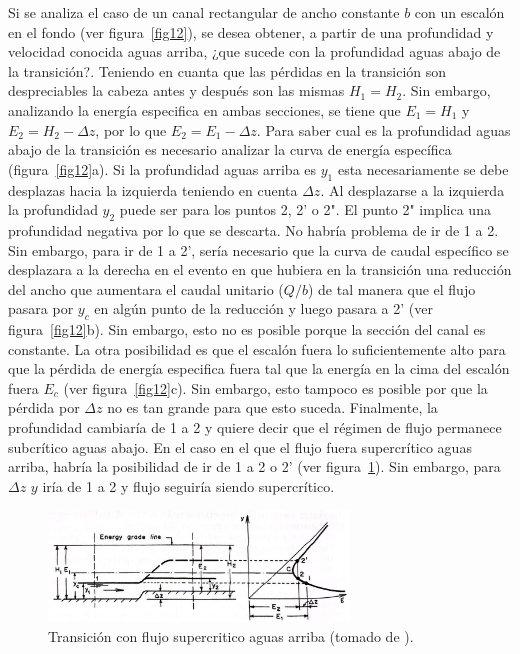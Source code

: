 \documentclass[11pt, oneside]{article}
\begin{document}
Si se analiza el caso de un canal rectangular de ancho constante $b$ con un escal\'on en el fondo (ver figura~\ref{fig12}), se desea obtener, a partir de una profundidad y velocidad conocida aguas arriba, ¿que sucede con la profundidad aguas abajo de la transici\'on?. Teniendo en cuanta que las p\'erdidas en la transici\'on son despreciables la cabeza antes y despu\'es son las mismas $H_1 = H_2$. Sin embargo, analizando la energ\'ia especifica en ambas secciones, se tiene que $E_1 = H_1$ y $E_2 = H_2-\Delta z$, por lo que $E_2 = E_1 - \Delta z$. Para saber cual es la profundidad aguas abajo de la transici\'on es necesario analizar la curva de energ\'ia espec\'ifica (figura~\ref{fig12}a). Si la profundidad aguas arriba es $y_1$ esta necesariamente se debe desplazas hacia la izquierda teniendo en cuenta $\Delta z$. Al desplazarse a la izquierda la profundidad $y_2$ puede ser para los puntos 2, 2' o 2". El punto 2" implica una profundidad negativa por lo que se descarta. No habr\'ia problema de ir de 1 a 2. Sin embargo, para ir de 1 a 2', ser\'ia necesario que la curva de caudal espec\'ifico se desplazara a la derecha en el evento en que hubiera en la transici\'on una reducci\'on del ancho que aumentara el caudal unitario ($Q/b$) de tal manera que el flujo pasara por $y_c$ en alg\'un punto de la reducci\'on y luego pasara a 2' (ver figura~\ref{fig12}b). Sin embargo, esto no es posible porque la secci\'on del canal es constante. La otra posibilidad es que el escalón fuera lo suficientemente alto para que la p\'erdida de energ\'ia especifica fuera tal que la energ\'ia en la cima del escal\'on fuera $E_c$ (ver figura~\ref{fig12}c). Sin embargo, esto tampoco es posible por que la p\'erdida por $\Delta z$ no es tan grande para que esto suceda. Finalmente, la profundidad cambiar\'ia de 1 a 2 y quiere decir que el r\'egimen de flujo permanece subcr\'itico aguas abajo. En el caso en el que el flujo fuera supercr\'itico aguas arriba, habr\'ia la posibilidad de ir de 1 a 2 o 2' (ver figura~\ref{fig13}). Sin embargo, para $\Delta z$ $y$ iría de 1 a 2 y flujo seguir\'ia siendo supercr\'itico. 

\begin{figure}[h]
\centering
\includegraphics[width=8cm]{fig29.jpeg}
\caption{Transici\'on con flujo supercritico aguas arriba (tomado de \cite{Chau}).}
\label{fig13}
\end{figure}
\end{document}
